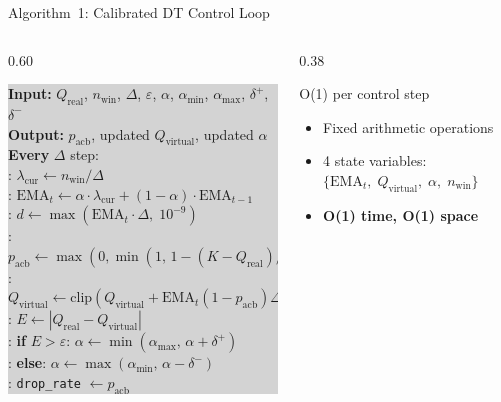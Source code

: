 \documentclass[aspectratio=169,t]{beamer}
\newcommand{\qreal}{Q_{\mathrm{real}}}
\newcommand{\qvirt}{Q_{\mathrm{virtual}}}
\newcommand{\pacb}{p_{\mathrm{acb}}}
\newcommand{\ema}{\mathrm{EMA}}
\begin{document}
\begin{frame}{Algorithm~1: Calibrated DT Control Loop}

  \begin{columns}[T]
    \begin{column}{0.60\textwidth}
      \setlength{\fboxsep}{5pt}
      \colorbox{lightgray}{%
      \begin{minipage}{0.96\linewidth}
        \footnotesize
        \textbf{Input:} $\qreal$,\; $n_{\mathrm{win}}$,\; $\Delta$,\;
                        $\varepsilon$,\; $\alpha$,\; $\alpha_{\min}$,\;
                        $\alpha_{\max}$,\; $\delta^{+}$,\; $\delta^{-}$\\[1pt]
        \textbf{Output:} $\pacb$,\; updated $\qvirt$,\; updated $\alpha$\\[3pt]
        \textbf{Every} $\Delta$ step:\\[1pt]
        :\; $\lambda_{\mathrm{cur}} \leftarrow n_{\mathrm{win}} / \Delta$\\
        :\; $\ema_t \leftarrow \alpha\cdot\lambda_{\mathrm{cur}}
                              + (1-\alpha)\cdot\ema_{t-1}$\\
        :\; $d \leftarrow \max(\ema_t\cdot\Delta,\;10^{-9})$\\
        :\; $\pacb \leftarrow \max(0,\min(1,\,1-(K-\qreal)/d))$\\
        :\; $\qvirt \leftarrow \mathrm{clip}(\qvirt +
                              \ema_t(1{-}\pacb)\Delta - c\Delta,\;0,K)$\\
        :\; $E \leftarrow |\qreal - \qvirt|$\\
        :\; \textbf{if} $E > \varepsilon$:\;
                   $\alpha \leftarrow \min(\alpha_{\max},\,\alpha+\delta^{+})$\\
        :\; \textbf{else}:\;
                   $\alpha \leftarrow \max(\alpha_{\min},\,\alpha-\delta^{-})$\\
        :\; \texttt{drop\_rate} $\leftarrow \pacb$
      \end{minipage}}
    \end{column}

    \begin{column}{0.38\textwidth}
      \vspace{4pt}
      \begin{block}{\small O(1) per control step}
        \small
        \begin{itemize}\setlength\itemsep{3pt}
          \item Fixed arithmetic operations
          \item 4 state variables: $\{\ema_t,\;\qvirt,\;\alpha,\;n_{\mathrm{win}}\}$
          \item \textbf{O(1) time, O(1) space}
        \end{itemize}
      \end{block}


\end{column}
\end{columns}
\end{frame}
\end{document}
